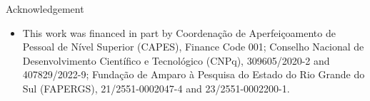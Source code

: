 \begin{frame}{Acknowledgement}
	
	\begin{itemize}
		\item This work was financed in part by Coordenação de Aperfeiçoamento de Pessoal de Nível Superior (CAPES), Finance Code 001; Conselho Nacional de Desenvolvimento Científico e Tecnológico (CNPq), 309605/2020-2 and 407829/2022-9; Fundação de Amparo à Pesquisa do Estado do Rio Grande do Sul (FAPERGS), 21/2551-0002047-4 and 23/2551-0002200-1.
	\end{itemize}

	
\end{frame}
